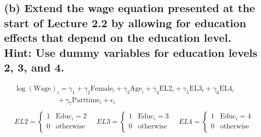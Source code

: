 \documentclass[12pt, a4paper]{article}
\begin{document}
\subsection*{(b) Extend the wage equation presented at the start of Lecture 2.2 by allowing for education effects that depend on the education level. Hint: Use dummy variables for education levels 2, 3, and 4.}
\begin{align*}
    &\log(\text{Wage})_i = \gamma_1 + \gamma_2 \text{Female}_i + \gamma_3 \text{Age}_i + \gamma_4 \text{EL2}_i+ \gamma_5 \text{EL3}_i+ \gamma_6 \text{EL4}_i\\
    &\qquad\qquad\qquad+ \gamma_7 \text{Parttime}_i + \epsilon_i\\\\
    &EL2 = \begin{cases}
        1 & \text{Educ}_i = 2\\
        0 & \text{otherwise}\\
    \end{cases} \quad
    EL3 = \begin{cases}
        1 & \text{Educ}_i = 3\\
        0 & \text{otherwise}\\
    \end{cases} \quad
    EL4 = \begin{cases}
        1 & \text{Educ}_i = 4\\
        0 & \text{otherwise}\\
    \end{cases}
\end{align*}
\vspace{1em}
\end{document}
